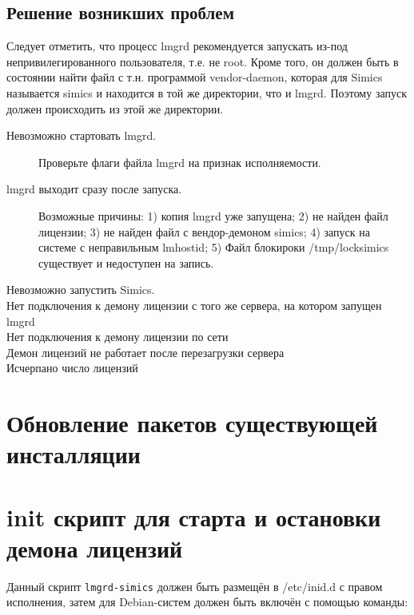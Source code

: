 \subsection{Решение возникших проблем}

Следует отметить, что процесс lmgrd рекомендуется запускать из-под непривилегированного пользователя, т.е. не root. Кроме того, он должен быть в состоянии найти файл с т.н. программой vendor-daemon, которая для Simics называется simics и находится в той же директории, что и lmgrd. Поэтому запуск должен происходить из этой же директории.

\begin{description}
    \item[Невозможно стартовать lmgrd.] Проверьте флаги файла lmgrd на признак исполняемости.
    
    \item[lmgrd выходит сразу после запуска.] Возможные причины: 1) копия lmgrd уже запущена; 2) не найден файл лицензии; 3) не найден файл с вендор-демоном simics; 4) запуск на системе с неправильным lmhostid; 5) Файл блокироки /tmp/locksimics существует и недоступен на запись.
    
    \item[Невозможно запустить Simics.]
    
    \item[Нет подключения к демону лицензии с того же сервера, на котором запущен lmgrd]
    
    \item[Нет подключения к демону лицензии по сети] 
    
    \item[Демон лицензий не работает после перезагрузки сервера] 
    
    \item[Исчерпано число лицензий]
    
\end{description}

\section{Обновление пакетов существующей инсталляции}

\todo

\section{init скрипт для старта и остановки демона лицензий}\label{sec:initscript}
Данный скрипт \texttt{lmgrd-simics} должен быть размещён в /etc/inid.d с правом исполнения, затем для Debian-систем должен быть включён с помощью команды:


